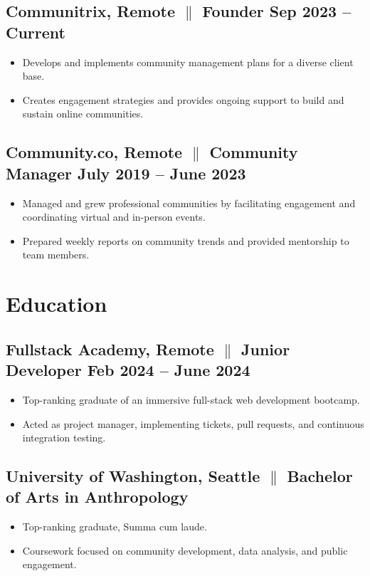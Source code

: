 \documentclass[a4paper,11pt]{article} %
\begin{document}
\subsection{Communitrix, Remote {$\parallel$}{ Founder} \hfill
      \textbf{Sep 2023 – Current}}
\begin{itemize}
      \item Develops and implements community management plans for a diverse client base.
      \item Creates engagement strategies and provides ongoing support to build and sustain online communities.
\end{itemize}
\subsection{Community.co, Remote {$\parallel$}{ Community Manager} \hfill
      \textbf{July 2019 – June 2023}}
\begin{itemize}
      \item Managed and grew professional communities by facilitating engagement and coordinating virtual and in-person events.
      \item Prepared weekly reports on community trends and provided mentorship to team members.
\end{itemize}

\section{Education}
\subsection{Fullstack Academy, Remote {$\parallel$} {Junior Developer} \hfill
      \textbf{Feb 2024 – June 2024}}
\begin{itemize}
      \item Top-ranking graduate of an immersive full-stack web development bootcamp.
      \item Acted as project manager, implementing tickets, pull requests, and continuous integration testing.
\end{itemize}

\subsection{University of Washington, Seattle {$\parallel$}{ Bachelor of Arts in Anthropology}}
\begin{itemize}
      \item Top-ranking graduate, Summa cum laude.
      \item Coursework focused on community development, data analysis, and public engagement.
\end{itemize}
\end{document}
